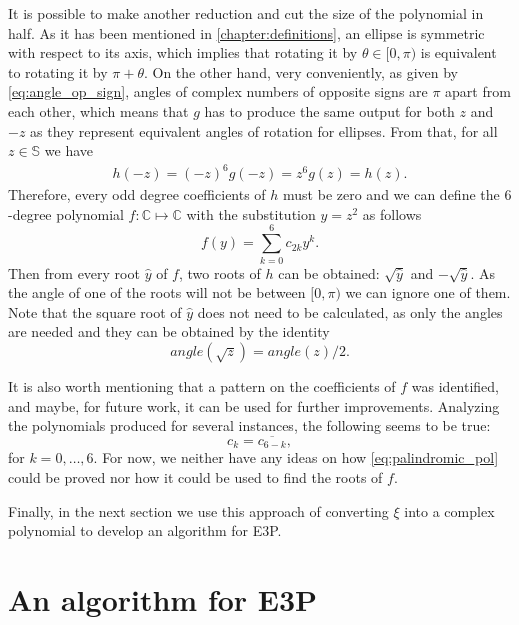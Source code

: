 It is possible to make another reduction and cut the size of the polynomial in half.
As it has been mentioned in \autoref{chapter:definitions}, an ellipse is symmetric with respect to its axis, which implies that rotating it by $\theta \in [0, \pi)$ is equivalent to rotating it by $\pi + \theta$.
On the other hand, very conveniently, as given by \autoref{eq:angle_op_sign}, angles of complex numbers of opposite signs are $\pi$ apart from each other, which means that $g$ has to produce the same output for both $z$ and $-z$ as they represent equivalent angles of rotation for ellipses.
From that, for all $z\in \mathbb{S}$ we have
\begin{align*}
h(-z) = (-z)^6g(-z) = z^6g(z) = h(z).
\end{align*}
Therefore, every odd degree coefficients of $h$ must be zero and we can define the $6$-degree polynomial $f : \mathbb{C} \mapsto \mathbb{C}$ with the substitution $y=z^2$ as follows
\begin{equation}
f(y) = \sum_{k=0}^{6} c_{2k} y^k.
\end{equation}
Then from every root $\hat{y}$ of $f$, two roots of $h$ can be obtained: $\sqrt{\hat{y}}$ and $-\sqrt{\hat{y}}$. As the angle of one of the roots will not be between $[0, \pi)$ we can ignore one of them. 
Note that the square root of $\hat{y}$ does not need to be calculated, as only the angles are needed and they can be obtained by the identity
\begin{equation*}
angle(\sqrt{z}) = angle(z)/2.
\end{equation*}

It is also worth mentioning that a pattern on the coefficients of $f$ was identified, and maybe, for future work, it can be used for further improvements. Analyzing the polynomials produced for several instances, the following seems to be true:
\begin{equation}\label{eq:palindromic_pol}
c_k = \overline{c_{6-k}},
\end{equation}
for $k=0, \dots, 6$. For now, we neither have any ideas on how \autoref{eq:palindromic_pol} could be proved nor how it could be used to find the roots of $f$.

Finally, in the next section we use this approach of converting $\xi$ into a complex polynomial to develop an algorithm for E3P.

\section{An algorithm for E3P}

